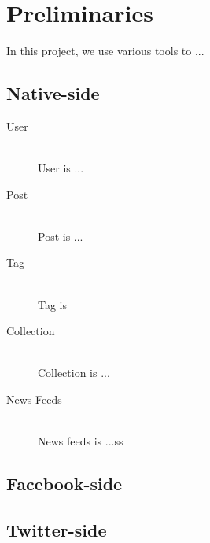 
%
%

\chapter{Preliminaries}
In this project, we use various tools to ...
\section{Native-side}
\begin{description}
	\item[User] \hfill \\
	User is ...
	\item[Post] \hfill \\
	Post is ...
	\item[Tag] \hfill \\
	Tag is
	\item[Collection] \hfill \\
	Collection is ...
	\item[News Feeds] \hfill \\
	News feeds is ...ss
\end{description}
\section{Facebook-side}

\section{Twitter-side}


